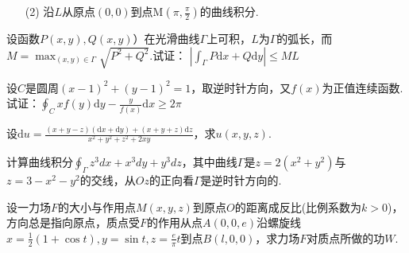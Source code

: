 \begin{xiti}
\begin{enumerate}
		\item [(2)]沿$L$从原点$(0,0)$到点M$(\pi ,\frac{\pi}{2})$的曲线积分.
	\end{enumerate}
	
	\item 设函数$P(x, y), Q(x, y)$）在光滑曲线$\Gamma$上可积，$L$为$\Gamma$的弧长，而$M=\max _{(x, y) \in \Gamma} \sqrt{P^{2}+Q^{2}}$.试证：
	$\left|\int_{\Gamma} P \mathrm{d} x+Q \mathrm{d} y\right| \leqslant M L$
	\item 设$C$是圆周$(x-1)^{2}+(y-1)^{2}=1$，取逆时针方向，又$f(x)$为正值连续函数.试证：$\oint_{C} x f(y) \mathrm{d} y-\frac{y}{f(x)} \mathrm{d} x \geqslant 2 \pi$
	\item 设$\mathrm{d} u=\frac{(x+y-z)(\mathrm{d} x+\mathrm{d} y)+(x+y+z) \mathrm{d} z}{x^{2}+y^{2}+z^{2}+2 x y}$，求$u(x,y,z)$.
	\item 计算曲线积分$\oint_{\Gamma} z^{3} d x+x^{3} d y+y^{3} d z$，其中曲线$\Gamma$是$z=2\left(x^{2}+y^{2}\right)$与$z=3-x^{2}-y^{2}$的交线，从$Oz$的正向看$\Gamma$是逆时针方向的.
	
	\item 设一力场$F$的大小与作用点$M(x,y,z)$到原点$O$的距离成反比(比例系数为$k>0$)，方向总是指向原点，质点受$F$的作用从点$A(0,0,e)$沿螺旋线$x=\frac{1}{2}(1+\cos t), y=\sin t, z=\frac{e}{\pi} t$到点$B(l,0,0)$，求力场$F$对质点所做的功$W$.
	
	 	
	
\end{xiti}



